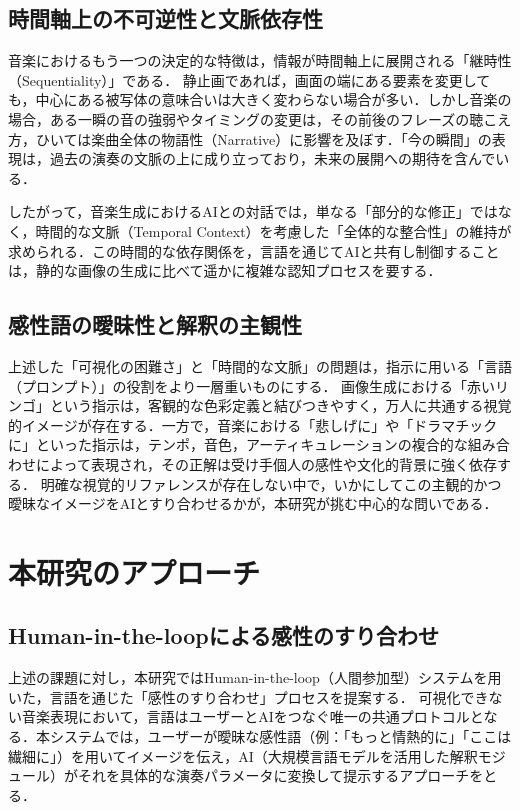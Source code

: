 \subsection{時間軸上の不可逆性と文脈依存性}
音楽におけるもう一つの決定的な特徴は，情報が時間軸上に展開される「継時性（Sequentiality）」である．
静止画であれば，画面の端にある要素を変更しても，中心にある被写体の意味合いは大きく変わらない場合が多い．しかし音楽の場合，ある一瞬の音の強弱やタイミングの変更は，その前後のフレーズの聴こえ方，ひいては楽曲全体の物語性（Narrative）に影響を及ぼす．「今の瞬間」の表現は，過去の演奏の文脈の上に成り立っており，未来の展開への期待を含んでいる．

したがって，音楽生成におけるAIとの対話では，単なる「部分的な修正」ではなく，時間的な文脈（Temporal Context）を考慮した「全体的な整合性」の維持が求められる．この時間的な依存関係を，言語を通じてAIと共有し制御することは，静的な画像の生成に比べて遥かに複雑な認知プロセスを要する．

\subsection{感性語の曖昧性と解釈の主観性}
上述した「可視化の困難さ」と「時間的な文脈」の問題は，指示に用いる「言語（プロンプト）」の役割をより一層重いものにする．
画像生成における「赤いリンゴ」という指示は，客観的な色彩定義と結びつきやすく，万人に共通する視覚的イメージが存在する．一方で，音楽における「悲しげに」や「ドラマチックに」といった指示は，テンポ，音色，アーティキュレーションの複合的な組み合わせによって表現され，その正解は受け手個人の感性や文化的背景に強く依存する．
明確な視覚的リファレンスが存在しない中で，いかにしてこの主観的かつ曖昧なイメージをAIとすり合わせるかが，本研究が挑む中心的な問いである．

\section{本研究のアプローチ}
\label{sec:approach}

\subsection{Human-in-the-loopによる感性のすり合わせ}
上述の課題に対し，本研究ではHuman-in-the-loop（人間参加型）システムを用いた，言語を通じた「感性のすり合わせ」プロセスを提案する．
可視化できない音楽表現において，言語はユーザーとAIをつなぐ唯一の共通プロトコルとなる．本システムでは，ユーザーが曖昧な感性語（例：「もっと情熱的に」「ここは繊細に」）を用いてイメージを伝え，AI（大規模言語モデルを活用した解釈モジュール）がそれを具体的な演奏パラメータに変換して提示するアプローチをとる．

